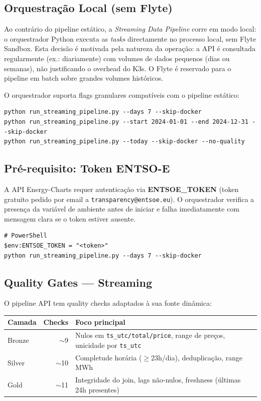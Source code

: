 \documentclass[11pt,a4paper]{article}
\begin{document}
\subsection{Orquestração Local (sem Flyte)}

Ao contrário do pipeline estático, a \textit{Streaming Data Pipeline} corre em modo local: o orquestrador Python executa as \textit{tasks} directamente no processo local, sem Flyte Sandbox. Esta decisão é motivada pela natureza da operação: a API é consultada regularmente (ex.: diariamente) com volumes de dados pequenos (dias ou semanas), não justificando o overhead do K3s. O Flyte é reservado para o pipeline em batch sobre grandes volumes históricos.

O orquestrador suporta flags granulares compatíveis com o pipeline estático:

\begin{lstlisting}
python run_streaming_pipeline.py --days 7 --skip-docker
python run_streaming_pipeline.py --start 2024-01-01 --end 2024-12-31 --skip-docker
python run_streaming_pipeline.py --today --skip-docker --no-quality
\end{lstlisting}

\subsection{Pré-requisito: Token ENTSO-E}

A API Energy-Charts requer autenticação via \textbf{ENTSOE\_TOKEN} (token gratuito pedido por email a \texttt{transparency@entsoe.eu}). O orquestrador verifica a presença da variável de ambiente antes de iniciar e falha imediatamente com mensagem clara se o token estiver ausente.

\begin{lstlisting}
# PowerShell
$env:ENTSOE_TOKEN = "<token>"
python run_streaming_pipeline.py --days 7 --skip-docker
\end{lstlisting}

\subsection{Quality Gates — Streaming}

O pipeline API tem quality checks adaptados à sua fonte dinâmica:

\begin{table}[h!]
\centering
\begin{tabular}{lrp{7cm}}
\toprule
\textbf{Camada} & \textbf{Checks} & \textbf{Foco principal} \\
\midrule
Bronze & $\sim$9 & Nulos em \texttt{ts\_utc/total/price}, range de preços, unicidade por \texttt{ts\_utc} \\
Silver & $\sim$10 & Completude horária ($\geq$23h/dia), deduplicação, range MWh \\
Gold   & $\sim$11 & Integridade do join, lags não-nulos, freshness (últimas 24h presentes) \\
\bottomrule
\end{tabular}
\end{table}
\end{document}
